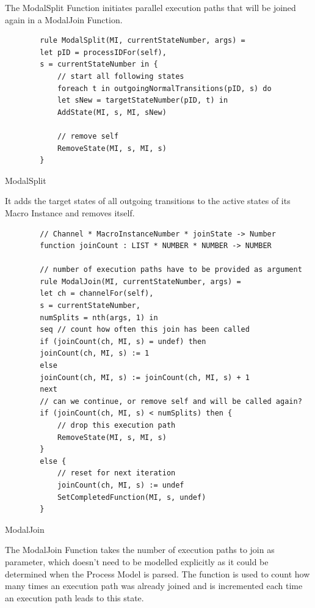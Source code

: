 The ModalSplit Function initiates parallel execution paths that will be joined
again in a ModalJoin Function.


\begin{listing}[H]
	\begin{verbatim}
		rule ModalSplit(MI, currentStateNumber, args) =
		let pID = processIDFor(self),
		s = currentStateNumber in {
			// start all following states
			foreach t in outgoingNormalTransitions(pID, s) do
			let sNew = targetStateNumber(pID, t) in
			AddState(MI, s, MI, sNew)
			
			// remove self
			RemoveState(MI, s, MI, s)
		}
	\end{verbatim}
	\caption{ModalSplit}
	\label{lst:shortasm:ModalSplit}
\end{listing}


It adds the target states of all outgoing transitions to the active states of its
Macro Instance and removes itself.



\begin{listing}[H]
	\begin{verbatim}
		// Channel * MacroInstanceNumber * joinState -> Number
		function joinCount : LIST * NUMBER * NUMBER -> NUMBER
		
		// number of execution paths have to be provided as argument
		rule ModalJoin(MI, currentStateNumber, args) =
		let ch = channelFor(self),
		s = currentStateNumber,
		numSplits = nth(args, 1) in
		seq // count how often this join has been called
		if (joinCount(ch, MI, s) = undef) then
		joinCount(ch, MI, s) := 1
		else
		joinCount(ch, MI, s) := joinCount(ch, MI, s) + 1
		next
		// can we continue, or remove self and will be called again?
		if (joinCount(ch, MI, s) < numSplits) then {
			// drop this execution path
			RemoveState(MI, s, MI, s)
		}
		else {
			// reset for next iteration
			joinCount(ch, MI, s) := undef
			SetCompletedFunction(MI, s, undef)
		}
	\end{verbatim}
	\caption{ModalJoin}
	\label{lst:shortasm:ModalJoin}
\end{listing}


The ModalJoin Function takes the number of execution paths to join as parameter,
which doesn't need to be modelled explicitly as it could be determined when the Process Model is parsed.
The  function is used to count how
many times an execution path was already joined and is incremented each time an
execution path leads to this state.

